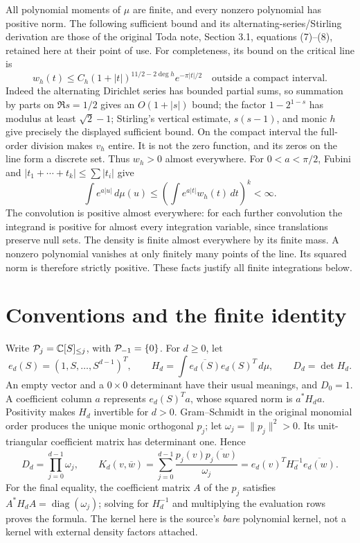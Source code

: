 \documentclass[11pt]{article}
\begin{document}
All polynomial moments of \(\mu\) are finite, and every nonzero
polynomial has positive norm. The following sufficient bound and its
alternating-series/Stirling derivation are those of the original Toda
note, Section 3.1, equations (7)--(8), retained here at their point of
use. For completeness, its bound on the critical line is
\[
 w_h(t)\leq C_h(1+|t|)^{11/2-2\deg h}e^{-\pi|t|/2}
 \quad\text{outside a compact interval}.
\]
Indeed the alternating Dirichlet series has bounded partial sums, so
summation by parts on \(\Re s=1/2\) gives an \(O(1+|s|)\) bound; the
factor \(1-2^{1-s}\) has modulus at least \(\sqrt2-1\); Stirling's
vertical estimate, \(s(s-1)\), and monic \(h\) give precisely the
displayed sufficient bound. On the compact interval the full-order
division makes \(v_h\) entire. It is not the zero function, and its
zeros on the line form a discrete set. Thus \(w_h>0\) almost everywhere.
For \(0<a<\pi/2\), Fubini and \(|t_1+\cdots+t_k|\leq\sum|t_i|\) give
\[
 \int e^{a|u|}\,d\mu(u)
 \leq\left(\int e^{a|t|}w_h(t)\,dt\right)^k<\infty.
\]
The convolution is positive almost everywhere: for each further
convolution the integrand is positive for almost every integration
variable, since translations preserve null sets. The density is finite
almost everywhere by its finite mass. A nonzero polynomial vanishes at
only finitely many points of the line. Its squared norm is therefore
strictly positive. These facts justify all finite integrations below.

\section{Conventions and the finite identity}\label{mrfinite:sec:statement}

Write \(\mathcal P_j=\mathbb C[S]_{\leq j}\), with \(\mathcal P_{-1}=\{0\}\).
For \(d\geq0\), let
\[
 e_d(S)=(1,S,\ldots,S^{d-1})^T,\qquad
 H_d=\int\overline{e_d(S)}e_d(S)^T\,d\mu,
 \qquad D_d=\det H_d.
\]
An empty vector and a \(0\times0\) determinant have their usual meanings,
and \(D_0=1\). A coefficient column \(a\) represents \(e_d(S)^Ta\),
whose squared norm is \(a^*H_da\). Positivity makes \(H_d\) invertible
for \(d>0\). Gram--Schmidt in the original monomial order produces the
unique monic orthogonal \(p_j\); let \(\omega_j=\|p_j\|^2>0\). Its
unit-triangular coefficient matrix has determinant one. Hence
\begin{equation}\label{mrfinite:eq:kernel}
 D_d=\prod_{j=0}^{d-1}\omega_j,
 \qquad
 K_d(v,\overline w)=\sum_{j=0}^{d-1}
      \frac{p_j(v)\overline{p_j(w)}}{\omega_j}
   =e_d(v)^TH_d^{-1}\overline{e_d(w)}.
\end{equation}
For the final equality, the coefficient matrix \(A\) of the \(p_j\)
satisfies \(A^*H_dA=\operatorname{diag}(\omega_j)\); solving for
\(H_d^{-1}\) and multiplying the evaluation rows proves the formula.
The kernel here is the source's \emph{bare} polynomial kernel, not a
kernel with external density factors attached.
\end{document}
